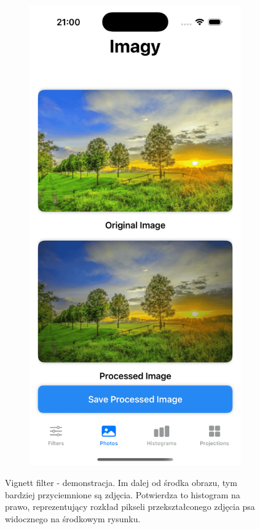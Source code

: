 \documentclass[a4paper]{article}
\begin{document}
\begin{figure}[H]
\begin{subfigure}{0.2\textwidth}
        \label{fig:barn_sobel}
    \end{subfigure}
    \hfill
    \begin{subfigure}{0.2\textwidth}
        \centering
        \includegraphics[width=\linewidth]{images/trees_vignette.png}
        \label{fig:trees_sobel}
    \end{subfigure}
    \caption{Vignett filter - demonstracja. Im dalej od środka obrazu, tym bardziej przyciemnione są zdjęcia. Potwierdza to histogram na prawo, reprezentujący rozkład pikseli przekształconego zdjęcia psa widocznego na środkowym rysunku.}
    \label{fig:vingnett}
\end{figure}
\end{document}
